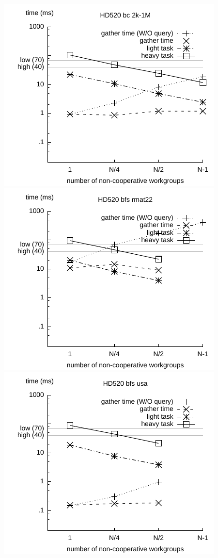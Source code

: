 \documentclass[sigconf]{acmart}
\begin{document}
{\includegraphics[width=.7\columnwidth]{images/barrier/hd520_bc_2k_1M.pdf} \\
\includegraphics[width=.7\columnwidth]{images/barrier/hd520_bfs_rmat22.pdf} \\
\includegraphics[width=.7\columnwidth]{images/barrier/hd520_bfs_usa.pdf} \\
}
\end{document}

